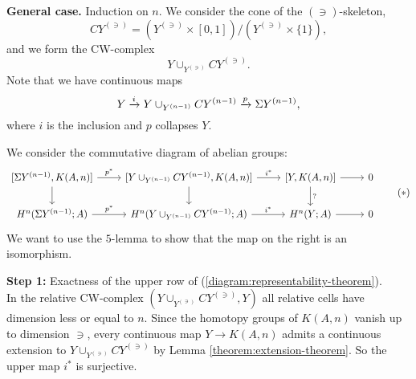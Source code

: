 


\textbf{General case.} Induction on $n$. We consider the cone of the $(\ni)$-skeleton, \[CY^{(\ni)}=(Y^{(\ni)}\times[0,1])/(Y^{(\ni)}\times \{1\}),\]
and we form the CW-complex
\[Y\cup_{Y^{(\ni)}}CY^{(\ni)}.\]
Note that we have continuous maps
\[Y\xrightarrow{i} Y\cup_{Y^{({n-1})}}CY^{({n-1})}\xrightarrow{p}\Sigma Y^{({n-1})},\]
where $i$ is the inclusion and $p$ collapses $Y$.

We consider the commutative diagram of abelian groups:
\[
\begin{tikzcd}\label{diagram:representability-theorem}
{[\Sigma Y^{(\ni)},K(A,n)]} \ar[d] \ar[r,"p^*"] & {[Y\cup_{Y^{(\ni)}}CY^{(\ni)},K(A,n)]} \ar[d] \ar[r, "i^*"] & {[Y,K(A,n)]} \ar[d,"?"] \ar[r] & 0\\
H^n(\Sigma Y^{(\ni)};A) \ar[r,"p^*"] & H^n(Y\cup_{Y^{(\ni)}}CY^{(\ni)};A) \ar[r,"i^*"] & H^n(Y;A) \ar[r] & 0
\end{tikzcd}\tag{$*$}
\]
We want to use the $5$-lemma to show that the map on the right is an isomorphism.

\textbf{Step 1: }Exactness of the upper row of (\ref{diagram:representability-theorem}). \\
In the relative CW-complex $(Y\cup_{Y^{(\ni)}}CY^{(\ni)},Y)$ all relative cells have dimension less or equal to $n$. Since the homotopy groups of $K(A,n)$ vanish up to dimension $\ni$, every continuous map $Y\to K(A,n)$ admits a continuous extension to $Y\cup_{Y^{(\ni)}}CY^{(\ni)}$ by Lemma \ref{theorem:extension-theorem}. So the upper map $i^*$ is surjective. 

